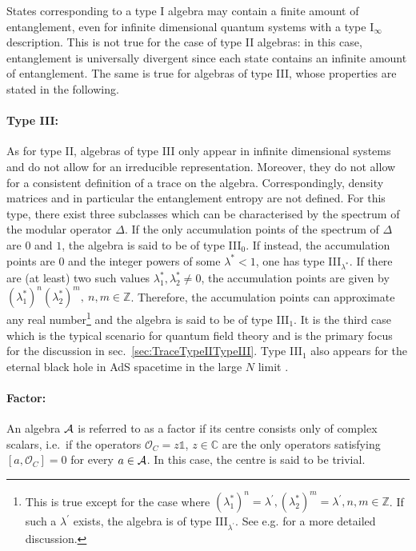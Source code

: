 \documentclass[a4paper,11pt]{article}
\newcommand{\1}{\mathds{1}}
\newcommand{\p}{{\prime}}
\begin{document}
States corresponding to a type I algebra may contain a finite amount of entanglement, even for infinite dimensional quantum systems with a type I$_\infty$ description. This is not true for the case of type II algebras: in this case, entanglement is universally divergent since each state contains an infinite amount of entanglement. The same is true for algebras of type III, whose properties are stated in the following.
\paragraph{Type III:}As for type II, algebras of type III only appear in infinite dimensional systems and do not allow for an irreducible representation. Moreover, they do not allow for a consistent definition of a trace on the algebra. Correspondingly, density matrices and in particular the entanglement entropy are not defined. For this type, there exist three subclasses which can be characterised by the spectrum of the modular operator $\Delta$. If the only accumulation points of the spectrum of $\Delta$ are $0$ and $1$, the algebra is said to be of type III$_0$. If instead, the accumulation points are $0$ and the integer powers of some $\lambda^\ast<1$, one has type III$_{\lambda^\ast}$. If there are (at least) two such values $\lambda_1^\ast,\lambda_2^\ast\neq0$, the accumulation points are given by $(\lambda_1^\ast)^n(\lambda_2^\ast)^m,~n,m\in\mathds{Z}$. Therefore, the accumulation points can approximate any real number\footnote{This is true except for the case where $(\lambda_1^\ast)^n=\lambda^\p,(\lambda_2^\ast)^m=\lambda^\p,n,m\in\mathds{Z}$. If such a $\lambda^\p$ exists, the algebra is of type III$_{\lambda^\p}$. See e.g. \cite{Witten:2018zxz} for a more detailed discussion.} and the algebra is said to be of type III$_1$. It is the third case which is the typical scenario for quantum field theory and is the primary focus for the discussion in sec.~\ref{sec:TraceTypeIITypeIII}. Type III$_1$ also appears for the eternal black hole in AdS spacetime in the large $N$ limit \cite{Jefferson:2018ksk,Leutheusser:2021frk,Leutheusser:2021qhd}.
\paragraph{Factor:}An algebra ${\cal A}$ is referred to as a factor if its centre consists only of complex scalars, i.e.~if the operators $\mathcal{O}_C=z\1$, $z\in\mathds{C}$ are the only operators satisfying $[a,\mathcal{O}_C]=0$ for every $a\in{\cal A}$. In this case, the centre is said to be trivial.
\end{document}
